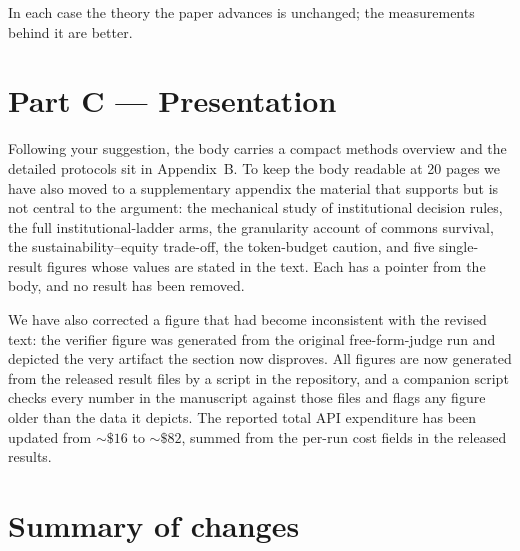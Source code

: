 \documentclass[11pt,a4paper]{article}
\begin{document}
In each case the theory the paper advances is unchanged; the measurements behind it
are better.

\section*{Part C --- Presentation}

Following your suggestion, the body carries a compact methods overview and the
detailed protocols sit in Appendix~B. To keep the body readable at 20 pages we have
also moved to a supplementary appendix the material that supports but is not central
to the argument: the mechanical study of institutional decision rules, the full
institutional-ladder arms, the granularity account of commons survival, the
sustainability--equity trade-off, the token-budget caution, and five single-result
figures whose values are stated in the text. Each has a pointer from the body, and
no result has been removed.

We have also corrected a figure that had become inconsistent with the revised text:
the verifier figure was generated from the original free-form-judge run and depicted
the very artifact the section now disproves. All figures are now generated from the
released result files by a script in the repository, and a companion script checks
every number in the manuscript against those files and flags any figure older than
the data it depicts. The reported total API expenditure has been updated from
${\sim}\$16$ to ${\sim}\$82$, summed from the per-run cost fields in the released
results.

\section*{Summary of changes}
\end{document}
